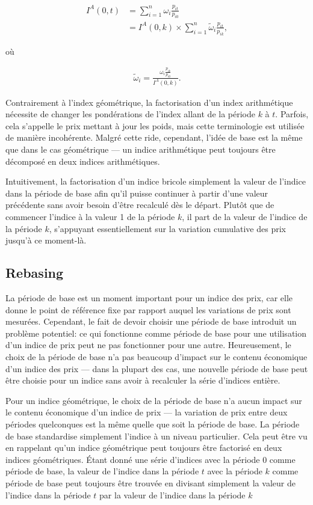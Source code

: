 \documentclass[
]{article}
\begin{document}
\begin{align*}
I^{A}(0, t) & = \sum_{i = 1}^{n} \omega_{i} \frac{p_{it}}{p_{i0}} \\
& = I^{A}(0, k) \times \sum_{i = 1}^{n} \tilde{\omega}_{i} \frac{p_{it}}{p_{ik}},
\end{align*}

où

\begin{align*}
\tilde{\omega}_{i} = \frac{\omega_{i} \frac{p_{ik}}{p_{i0}}}{I^{A}(0, k)}.
\end{align*}

Contrairement à l'index géométrique, la factorisation d'un index arithmétique nécessite de changer les pondérations de l'index allant de la période \(k\) à \(t\). Parfois, cela s'appelle le prix mettant à jour les poids, mais cette terminologie est utilisée de manière incohérente. Malgré cette ride, cependant, l'idée de base est la même que dans le cas géométrique --- un indice arithmétique peut toujours être décomposé en deux indices arithmétiques.

Intuitivement, la factorisation d'un indice bricole simplement la valeur de l'indice dans la période de base afin qu'il puisse continuer à partir d'une valeur précédente sans avoir besoin d'être recalculé dès le départ. Plutôt que de commencer l'indice à la valeur 1 de la période \(k\), il part de la valeur de l'indice de la période \(k\), s'appuyant essentiellement sur la variation cumulative des prix jusqu'à ce moment-là.

\hypertarget{rebasing}{%
\subsection{Rebasing}\label{rebasing}}

La période de base est un moment important pour un indice des prix, car elle donne le point de référence fixe par rapport auquel les variations de prix sont mesurées. Cependant, le fait de devoir choisir une période de base introduit un problème potentiel: ce qui fonctionne comme période de base pour une utilisation d'un indice de prix peut ne pas fonctionner pour une autre. Heureusement, le choix de la période de base n'a pas beaucoup d'impact sur le contenu économique d'un indice des prix --- dans la plupart des cas, une nouvelle période de base peut être choisie pour un indice sans avoir à recalculer la série d'indices entière.

Pour un indice géométrique, le choix de la période de base n'a aucun impact sur le contenu économique d'un indice de prix --- la variation de prix entre deux périodes quelconques est la même quelle que soit la période de base. La période de base standardise simplement l'indice à un niveau particulier. Cela peut être vu en rappelant qu'un indice géométrique peut toujours être factorisé en deux indices géométriques. Étant donné une série d'indices avec la période 0 comme période de base, la valeur de l'indice dans la période \(t\) avec la période \(k\) comme période de base peut toujours être trouvée en divisant simplement la valeur de l'indice dans la période \(t\) par la valeur de l'indice dans la période \(k\)
\end{document}
